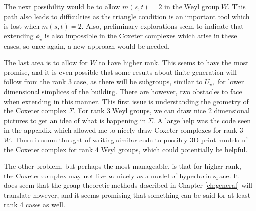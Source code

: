 \documentclass[class=book, crop=false]{standalone}
\begin{document}
The next possibility would be to allow $m(s,t)=2$ in the Weyl group $W.$ This path also leads to difficulties as the triangle condition is an important tool which is lost when $m(s,t)=2.$ Also, preliminary explorations seem to indicate that extending $\phi_v$ is also impossible in the Coxeter complexes which arise in these cases, so once again, a new approach would be needed.

The last area is to allow for $W$ to have higher rank. This seems to have the most promise, and it is even possible that some results about finite generation will follow from the rank 3 case, as there will be subgroups, similar to $U_v,$ for lower dimensional simplices of the building. There are however, two obstacles to face when extending in this manner. This first issue is understanding the geometry of the Coxeter complex $\Sigma.$ For rank 3 Weyl groups, we can draw nice 2 dimensional pictures to get an idea of what is happening in $\Sigma.$ A large help was the code seen in the appendix which allowed me to nicely draw Coxeter complexes for rank 3 $W.$ There is some thought of writing similar code to possibly 3D print models of the Coxeter complex for rank 4 Weyl groups, which could potentially be helpful.

The other problem, but perhaps the most manageable, is that for higher rank, the Coxeter complex may not live so nicely as a model of hyperbolic space. It does seem that the group theoretic methods described in Chapter \ref{ch:general} will translate however, and it seems promising that something can be said for at least rank 4 cases as well.
\end{document}

